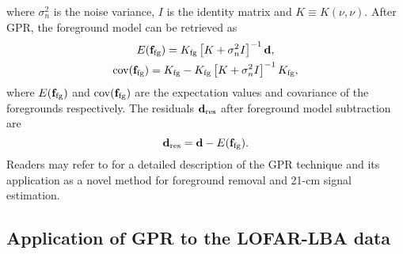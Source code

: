 \documentclass[fleqn,usenatbib]{mnras}
\begin{document}
where $\sigma_n^2$ is the noise variance, $I$ is the identity matrix and $K\equiv K(\nu,\nu)$. After GPR, the foreground model can be retrieved as
\begin{gather}
E({\bf f}_{\text{fg}}) = K_{\text{fg}}\left[ K + \sigma_n^2 I \right]^{-1} {\bf d}, \\
\text{cov}({\bf f}_{\text{fg}}) = K_{\text{fg}} - K_{\text{fg}} \left[ K + \sigma_n^2 I \right]^{-1} K_{\text{fg}}, 
\end{gather}
where $E({\bf f}_{\text{fg}})$ and $\text{cov}({\bf f}_{\text{fg}})$ are the expectation values and covariance of the foregrounds respectively. The residuals ${\bf d}_{\text{res}}$ after foreground model subtraction are 
\begin{equation}
{\bf d}_{\text{res}} = {\bf d} - E({\bf f}_{\text{fg}}).
\end{equation}
Readers may refer to \cite{mertens2018} for a detailed description of the GPR technique and its application as a novel method for foreground removal and 21-cm signal estimation.

\subsection{Application of GPR to the LOFAR-LBA data}\label{subsec:GPR-application}
\end{document}
